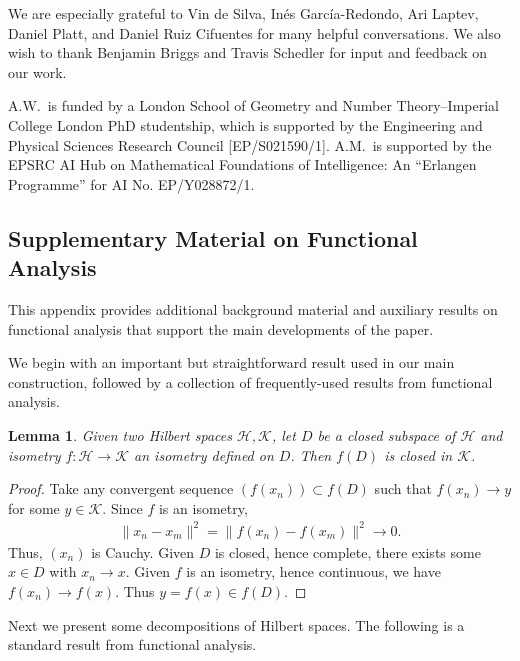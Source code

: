 \documentclass[11pt]{article}
\newtheorem{lemma}[theorem]{Lemma}
\theoremstyle{definition}
\theoremstyle{remark}
\begin{document}
We are especially grateful to Vin de Silva, In\'{e}s Garc\'{i}a-Redondo, Ari Laptev,  Daniel Platt, and Daniel Ruiz Cifuentes for many helpful conversations. We also wish to thank Benjamin Briggs and Travis Schedler for input and feedback on our work. 

A.W.~is funded by a London School of Geometry and Number Theory--Imperial College London PhD studentship, which is supported by the Engineering and Physical Sciences Research Council [EP/S021590/1]. A.M.~is supported by the EPSRC AI Hub on Mathematical Foundations of Intelligence: An ``Erlangen Programme'' for AI No. EP/Y028872/1.

\begin{appendices} 
\section{Supplementary Material on Functional Analysis}
\label{appendix:operator_theory}

This appendix provides additional background material and auxiliary results on functional analysis that support the main developments of the paper.

We begin with an important but straightforward result used in our main construction, followed by a collection of frequently-used results from functional analysis.

\begin{lemma} \label{closedstaysclosed}
    Given two Hilbert spaces $\mathcal{H},\mathcal{K}$, let $D$ be a closed subspace of $\mathcal{H}$ and isometry $f:\mathcal{H}\to\mathcal{K}$ an isometry defined on $D$. Then $f(D)$ is closed in $\mathcal{K}$.
\end{lemma}
\begin{proof}
        Take any convergent sequence $(f(x_n))\subset f(D)$ such that $f(x_n)\to y$ for some $y\in \mathcal{K}$. Since $f$ is an isometry, 
        \begin{align*}
            \|x_n-x_m\|^2=\|f(x_n)-f(x_m)\|^2\to 0.
        \end{align*}
        Thus, $(x_n)$ is Cauchy. Given $D$ is closed, hence complete, there exists some $x\in D$ with $x_n\to x$. Given $f$ is an isometry, hence continuous, we have $f(x_n)\to f(x)$. Thus $y=f(x)\in f(D)$.
    \end{proof}

Next we present some decompositions of Hilbert spaces. The following is a standard result from functional analysis. 


\end{appendices}
\end{document}
